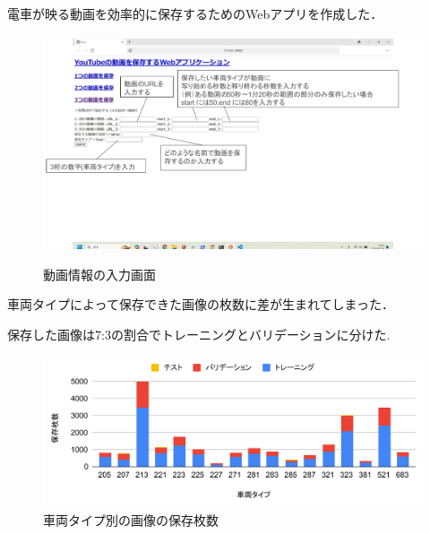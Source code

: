 電車が映る動画を効率的に保存するためのWebアプリを作成した．

\begin{figure}
	\centering
	\includegraphics[width=0.65\linewidth]{../paper/chap3/fig/django}
	\label{fig:django}
	\caption{動画情報の入力画面}	
\end{figure}

\href{run:./fig/demo1.mp4}{\textcolor[hsb]{0.0, 0.7, 1.0}{\faPlayCircle[regular]}} 

\newpage

車両タイプによって保存できた画像の枚数に差が生まれてしまった．

保存した画像は7:3の割合でトレーニングとバリデーションに分けた.
\begin{figure}
	\centering
	\includegraphics[width=0.8\linewidth]{fig/chart2}
	\caption{車両タイプ別の画像の保存枚数}
	\label{fig:chart2}
\end{figure}



